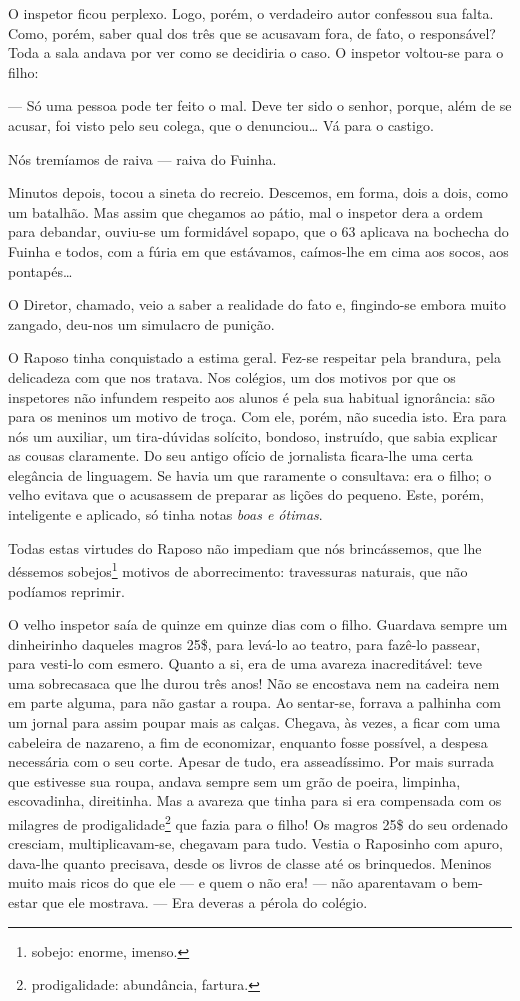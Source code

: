 O inspetor ficou perplexo. Logo, porém, o verdadeiro autor confessou sua
falta. Como, porém, saber qual dos três que se acusavam fora, de fato, o
responsável? Toda a sala andava por ver como se decidiria o caso. O
inspetor voltou-se para o filho:

--- Só uma pessoa pode ter feito o mal. Deve ter sido o senhor, porque,
além de se acusar, foi visto pelo seu colega, que o denunciou\ldots{} Vá para
o castigo.

Nós tremíamos de raiva --- raiva do Fuinha.

Minutos depois, tocou a sineta do recreio. Descemos, em forma, dois a
dois, como um batalhão. Mas assim que chegamos ao pátio, mal o inspetor
dera a ordem para debandar, ouviu-se um formidável sopapo, que o 63
aplicava na bochecha do Fuinha e todos, com a fúria em que estávamos,
caímos-lhe em cima aos socos, aos pontapés\ldots{}

O Diretor, chamado, veio a saber a realidade do fato e, fingindo-se
embora muito zangado, deu-nos um simulacro de punição.

O Raposo tinha conquistado a estima geral. Fez-se respeitar pela
brandura, pela delicadeza com que nos tratava. Nos colégios, um dos
motivos por que os inspetores não infundem respeito aos alunos é pela
sua habitual ignorância: são para os meninos um motivo de troça. Com
ele, porém, não sucedia isto. Era para nós um auxiliar, um tira-dúvidas
solícito, bondoso, instruído, que sabia explicar as cousas claramente.
Do seu antigo ofício de jornalista ficara-lhe uma certa elegância de
linguagem. Se havia um que raramente o consultava: era o filho; o velho
evitava que o acusassem de preparar as lições do pequeno. Este, porém,
inteligente e aplicado, só tinha notas \emph{boas e ótimas}.

Todas estas virtudes do Raposo não impediam que nós brincássemos, que
lhe déssemos sobejos\footnote{sobejo: enorme, imenso.} motivos de
aborrecimento: travessuras naturais, que não podíamos reprimir.

O velho inspetor saía de quinze em quinze dias com o filho. Guardava
sempre um dinheirinho daqueles magros 25\$, para levá-lo ao teatro, para
fazê-lo passear, para vesti-lo com esmero. Quanto a si, era de uma
avareza inacreditável: teve uma sobrecasaca que lhe durou três anos! Não
se encostava nem na cadeira nem em parte alguma, para não gastar a
roupa. Ao sentar-se, forrava a palhinha com um jornal para assim poupar
mais as calças. Chegava, às vezes, a ficar com uma cabeleira de
nazareno, a fim de economizar, enquanto fosse possível, a despesa
necessária com o seu corte. Apesar de tudo, era asseadíssimo. Por mais
surrada que estivesse sua roupa, andava sempre sem um grão de poeira,
limpinha, escovadinha, direitinha. Mas a avareza que tinha para si era
compensada com os milagres de prodigalidade\footnote{prodigalidade:
  abundância, fartura.} que fazia para o filho! Os magros 25\$ do seu
ordenado cresciam, multiplicavam-se, chegavam para tudo. Vestia o
Raposinho com apuro, dava-lhe quanto precisava, desde os livros de
classe até os brinquedos. Meninos muito mais ricos do que ele --- e quem
o não era! --- não aparentavam o bem-estar que ele mostrava. --- Era
deveras a pérola do colégio.

